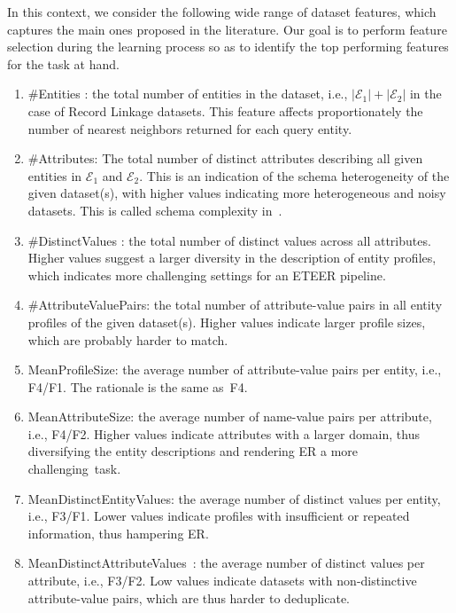 In this context, we consider the following wide range of dataset features, which captures the main ones proposed in the literature. Our goal is to perform feature selection during the learning process so as to identify the top performing features for the task at hand.
\begin{enumerate}[leftmargin=*, label=F\arabic*), start=1]
    \item \#Entities \cite{DBLP:conf/sigmod/IlyasMHBA04}: the total number of entities in the dataset, i.e., $|\mathcal{E}_1| + |\mathcal{E}_2|$ in the case of Record Linkage datasets. This feature 
    affects proportionately the number of nearest neighbors returned for each query entity.
    \item \#Attributes: The total number of distinct attributes describing all given entities in $\mathcal{E}_1$ and $\mathcal{E}_2$. This is an indication of the schema heterogeneity of the given dataset(s), with higher values indicating more heterogeneous and noisy datasets. This is called schema complexity in~\cite{DBLP:conf/cikm/PrimpeliB20}.
    \item \#DistinctValues \cite{DBLP:conf/sigmod/IlyasMHBA04}: the total number of distinct values across all attributes. Higher values suggest a larger diversity in the description of entity profiles, which indicates more challenging settings for an ETEER pipeline.
    \item \#AttributeValuePairs: the total number of attribute-value pairs in all entity profiles of the given dataset(s). Higher values indicate larger profile sizes, which are probably harder to match.
    \item MeanProfileSize: the average number of attribute-value pairs per entity, i.e., F4/F1. The rationale is the same as~F4.
    \item MeanAttributeSize: the average number of name-value pairs per attribute, i.e., F4/F2. Higher values indicate attributes with a larger domain, thus diversifying the entity descriptions and rendering ER a more challenging~task.
    \item MeanDistinctEntityValues: the average number of distinct values per entity, i.e., F3/F1. Lower values indicate profiles with insufficient or repeated information, thus hampering ER.
    \item MeanDistinctAttributeValues~\cite{DBLP:journals/pvldb/SuchanekAS11}: the average number of distinct values per attribute, i.e., F3/F2. Low values indicate datasets with non-distinctive attribute-value pairs, which are thus harder to deduplicate.

\end{enumerate}
